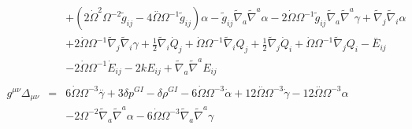 \begin{eqnarray}
&& + (2 \dot{\Omega}^2 \Omega^{-2} \tilde{g}_{ij} - 4 \overset{..}{\Omega} \Omega^{-1} \tilde{g}_{ij}) \alpha -  \tilde{g}_{ij} \tilde{\nabla}_{a}\tilde{\nabla}^{a}\alpha - 2 \dot{\Omega} \Omega^{-1} \tilde{g}_{ij} \tilde{\nabla}_{a}\tilde{\nabla}^{a}\gamma + \tilde{\nabla}_{j}\tilde{\nabla}_{i}\alpha \nonumber \\ 
&& + 2 \dot{\Omega} \Omega^{-1} \tilde{\nabla}_{j}\tilde{\nabla}_{i}\gamma +\tfrac{1}{2} \tilde{\nabla}_{i}\dot{Q}_{j} + \dot{\Omega} \Omega^{-1} \tilde{\nabla}_{i}Q_{j} + \tfrac{1}{2} \tilde{\nabla}_{j}\dot{Q}_{i} + \dot{\Omega} \Omega^{-1} \tilde{\nabla}_{j}Q_{i}- \overset{..}{E}_{ij} 
\nonumber\\
&&- 2 \dot{\Omega} \Omega^{-1} \dot{E}_{ij} - 2 k E_{ij} + \tilde{\nabla}_{a}\tilde{\nabla}^{a}E_{ij}
\\  \nonumber\\ 
g^{\mu\nu}\Delta_{\mu\nu}&=& 6 \dot{\Omega} \Omega^{-3} \overset{..}{\gamma} + 3 \delta p^{GI}{} -  \delta \rho^{GI}{} - 6 \dot{\Omega} \Omega^{-3} \dot{\alpha} + 12 \overset{..}{\Omega} \Omega^{-3} \dot{\gamma} - 12 \overset{..}{\Omega} \Omega^{-3} \alpha 
\nonumber\\
&&- 2 \Omega^{-2} \tilde{\nabla}_{a}\tilde{\nabla}^{a}\alpha  - 6 \dot{\Omega} \Omega^{-3} \tilde{\nabla}_{a}\tilde{\nabla}^{a}\gamma 
\end{eqnarray}


